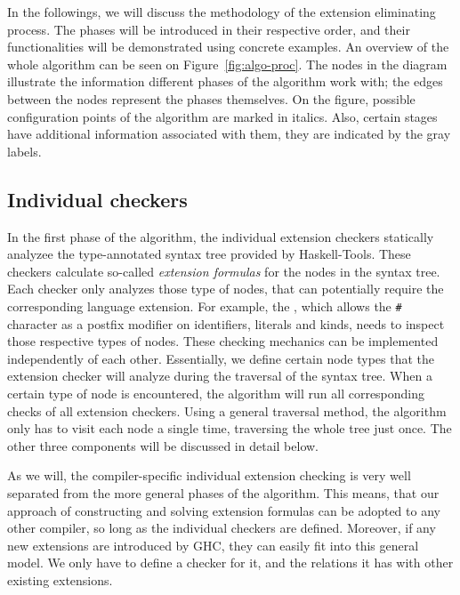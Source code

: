 \documentclass[main.tex]{subfiles}
\begin{document}
	
	In the followings, we will discuss the methodology of the extension eliminating process. The phases will be introduced in their respective order, and their functionalities will be demonstrated using concrete examples. An overview of the whole algorithm can be seen on Figure~\ref{fig:algo-proc}. The nodes in the diagram illustrate the information different phases of the algorithm work with; the edges between the nodes represent the phases themselves. On the figure, possible configuration points of the algorithm are marked in italics. Also, certain stages have additional information associated with them, they are indicated by the gray labels.	
	
	\begin{figure}[t] 
		\centering
		
	\end{figure}
	
	\subsection{Individual checkers}
	
	In the first phase of the algorithm, the individual extension checkers statically analyzee the type-annotated syntax tree provided by Haskell-Tools. These checkers calculate so-called \emph{extension formulas} for the nodes in the syntax tree. Each checker only analyzes those type of nodes, that can potentially require the corresponding language extension. For example, the , which allows the \texttt{\#} character as a postfix modifier on identifiers, literals and kinds, needs to inspect those respective types of nodes. These checking mechanics can be implemented independently of each other. Essentially, we define certain node types that the extension checker will analyze during the traversal of the syntax tree. When a certain type of node is encountered, the algorithm will run all corresponding checks of all extension checkers. Using a general traversal method, the algorithm only has to visit each node a single time, traversing the whole tree just once. The other three components will be discussed in detail below.
	
	As we will, the compiler-specific individual extension checking is very well separated from the more general phases of the algorithm. This means, that our approach of constructing and solving extension formulas can be adopted to any other compiler, so long as the individual checkers are defined. Moreover, if any new extensions are introduced by GHC, they can easily fit into this general model. We only have to define a checker for it, and the relations it has with other existing extensions.	
\end{document}
